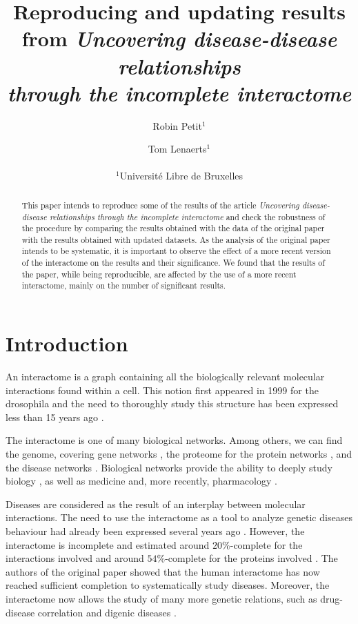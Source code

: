 \documentclass[letterpaper]{article}
\title{Reproducing and updating results from
\textit{Uncovering disease-disease relationships\\through the incomplete interactome}}
\author{Robin Petit$^{1}$ \and Tom Lenaerts$^{1}$\\
\mbox{}\\
$^1$Université Libre de Bruxelles}
\begin{document}
\maketitle

\begin{abstract}
This paper intends to reproduce some of the results of the article \textit{Uncovering
disease-disease relationships through the incomplete interactome} \citep{originalPaper}
and check the robustness of the procedure by comparing the results obtained with the data
of the original paper with the results obtained with updated datasets. As the analysis of
the original paper intends to be systematic, it is important to observe the effect of a
more recent version of the interactome on the results and their significance. We found that
the results of the paper, while being reproducible, are affected by the use of a more recent
interactome, mainly on the number of significant results.
\end{abstract}

\section{Introduction}
An interactome is a graph containing all the biologically relevant molecular interactions found within
a cell. This notion first appeared in 1999 for the drosophila \citep{sanchez1999grasping} and the need
to thoroughly study this structure has been expressed less than 15 years ago
\citep{UnderstandingTheCellFunctionalOrganization}.

The interactome is one of many biological networks. Among others, we can find the genome, covering
gene networks \citep{boucher2013genetic}, the proteome for the protein networks
\citep{rolland2014proteome}, and the disease networks \citep{goh2007human}. Biological networks provide
the ability to deeply study biology \citep{UnderstandingTheCellFunctionalOrganization}, as well as
medicine \citep{barabasi2011network} and, more recently, pharmacology \citep{hopkins2008network}.

Diseases are considered as the result of an interplay between molecular interactions. The need to use
the interactome as a tool to analyze genetic diseases behaviour had already been expressed several years
ago \citep{vidal2011interactome}. However, the interactome is incomplete and estimated around $20\%$-complete
for the interactions involved and around $54\%$-complete for the proteins involved
\citep{ATruerMeasureOfOurIgnorance,estimatingTheSizeOfTheHumanInteractome}. The authors of the original paper
\citep{originalPaper} showed that the human interactome has now reached sufficient completion to systematically
study diseases. Moreover, the interactome now allows the study of many more genetic relations, such as
drug-disease correlation \citep{Yu2016extraction} and digenic diseases \citep{gazzo2015dida}.
\end{document}
